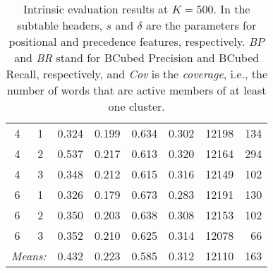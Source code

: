 \begin{table}
{\begin{tabular}{cc|ccccrr}
4 & 1 & 0.324 & 0.199 & 0.634 & 0.302 & 12198 & 134 \\
4 & 2 & 0.537 & 0.217 & 0.613 & 0.320 & 12164 & 294 \\
4 & 3 & 0.348 & 0.212 & 0.615 & 0.316 & 12149 & 102 \\ \hline
6 & 1 & 0.326 & 0.179 & 0.673 & 0.283 & 12191 & 130 \\
6 & 2 & 0.350 & 0.203 & 0.638 & 0.308 & 12153 & 102 \\
6 & 3 & 0.352 & 0.210 & 0.625 & 0.314 & 12078 & 66 \\
\multicolumn{2}{c|}{\textit{Means:}} & 0.432 & 0.223 & 0.585 & 0.312 & 12110 & 163 \\
\end{tabular}
}
\caption{Intrinsic evaluation results at $K = 500$. In the subtable headers, $s$ and $\delta$ are the parameters for positional and precedence features, respectively. \textit{BP} and \textit{BR} stand for BCubed Precision and BCubed Recall, respectively, and \textit{Cov} is the \textit{coverage}, i.e., the number of words that are active members of at least one cluster.}
\label{tab:intr-500}
\end{table}

